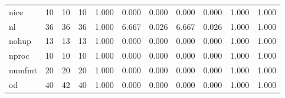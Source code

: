 \begin{longtable}{lp{1.8cm}p{1.8cm}p{1.8cm}p{1.8cm}p{1.8cm}p{1.8cm}p{1.8cm}p{1.8cm}p{1.8cm}p{1.8cm}}
nice      &                           10 &                 10 &                                10 &                                      1.000 &                                  0.000 &                                        0.000 &                             0.000 &                                   0.000 &                              1.000 &                                              1.000 \\
nl        &                           36 &                 36 &                                36 &                                      1.000 &                                  6.667 &                                        0.026 &                             6.667 &                                   0.026 &                              1.000 &                                              1.000 \\
nohup     &                           13 &                 13 &                                13 &                                      1.000 &                                  0.000 &                                        0.000 &                             0.000 &                                   0.000 &                              1.000 &                                              1.000 \\
nproc     &                           10 &                 10 &                                10 &                                      1.000 &                                  0.000 &                                        0.000 &                             0.000 &                                   0.000 &                              1.000 &                                              1.000 \\
numfmt    &                           20 &                 20 &                                20 &                                      1.000 &                                  0.000 &                                        0.000 &                             0.000 &                                   0.000 &                              1.000 &                                              1.000 \\
od        &                           40 &                 42 &                                40 &                                      1.000 &                                  0.000 &                                        0.000 &                             0.000 &                                   0.000 &                              1.000 &                                              1.000 \\

\end{longtable}
